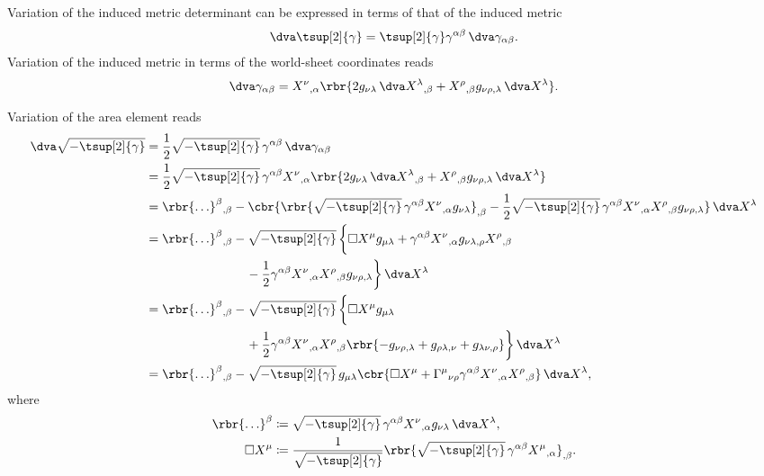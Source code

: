 \documentclass[a4paper,11pt]{article}
\begin{document}
Variation of the induced metric determinant can be expressed in terms of that 
of the induced metric
\begin{align}
\dva \tsup[2]{\gamma} = \tsup[2]{\gamma} \gamma^{\alpha\beta}\,\dva 
	\gamma_{\alpha\beta}.
\end{align}
Variation of the induced metric in terms of the world-sheet coordinates reads 
\begin{align}
\dva \gamma_{\alpha\beta} = X^{\nu}{}_{,\alpha} \rbr{
	2 g_{\nu\lambda}\, \dva X^{\lambda}{}_{,\beta} + 
	X^{\rho}{}_{,\beta} g_{\nu\rho,\lambda}\, \dva X^{\lambda}}.
\end{align}

Variation of the area element reads
\begin{align}
\dva \sqrt{-\tsup[2]{\gamma}} &=
\frac{1}{2} \sqrt{-\tsup[2]{\gamma}}\, \gamma^{\alpha\beta}\,
\dva \gamma_{\alpha\beta}
\nonumber \\
&=
\frac{1}{2} \sqrt{-\tsup[2]{\gamma}}\, \gamma^{\alpha\beta}
X^{\nu}{}_{,\alpha}\rbr{2 g_{\nu\lambda}\, \dva X^{\lambda}{}_{,\beta} + 
	X^{\rho}{}_{,\beta} g_{\nu\rho,\lambda}\, \dva X^{\lambda}}
\nonumber \\
&=
\rbr{\ldots}^{\beta}{}_{,\beta} - \cbr{
\rbr{\sqrt{-\tsup[2]{\gamma}}\, \gamma^{\alpha\beta} 
	X^{\nu}{}_{,\alpha} g_{\nu\lambda}}_{,\beta} - 
\frac{1}{2} \sqrt{-\tsup[2]{\gamma}}\, \gamma^{\alpha\beta} X^{\nu}{}_{,\alpha} 
X^{\rho}{}_{,\beta} g_{\nu\rho,\lambda}}\, \dva X^{\lambda}
\nonumber \\
&=
\rbr{\ldots}^{\beta}{}_{,\beta} - \sqrt{-\tsup[2]{\gamma}}\, \bigg\{
	\square X^{\mu} g_{\mu\lambda} + 
	\gamma^{\alpha\beta} X^{\nu}{}_{,\alpha}
		g_{\nu\lambda,\rho} X^{\rho}{}_{,\beta} 
\nonumber \\
&\qquad\qquad\qquad\qquad -
	\frac{1}{2} \gamma^{\alpha\beta} X^{\nu}{}_{,\alpha} X^{\rho}{}_{,\beta}
		g_{\nu\rho,\lambda} \bigg\}\, \dva X^{\lambda}
\nonumber \\
&=
\rbr{\ldots}^{\beta}{}_{,\beta} - \sqrt{-\tsup[2]{\gamma}}\, \bigg\{
	\square X^{\mu} g_{\mu\lambda} 
\nonumber \\
&\qquad\qquad\qquad\qquad + 
	\frac{1}{2} \gamma^{\alpha\beta} X^{\nu}{}_{,\alpha} X^{\rho}{}_{,\beta}
		\rbr{-g_{\nu\rho,\lambda} + g_{\rho\lambda,\nu} + g_{\lambda\nu,\rho}}
	\bigg\}\, \dva X^{\lambda}
\nonumber \\
&=
\rbr{\ldots}^{\beta}{}_{,\beta} - \sqrt{-\tsup[2]{\gamma}}\, g_{\mu\lambda}
	\cbr{ \square X^{\mu} + 
	\Gamma^{\mu}{}_{\nu\rho} \gamma^{\alpha\beta}
		X^{\nu}{}_{,\alpha} X^{\rho}{}_{,\beta}
	} \, \dva X^{\lambda},
\end{align}
where
\begin{align}
\rbr{\ldots}^{\beta} &\coloneqq \sqrt{-\tsup[2]{\gamma}}\, \gamma^{\alpha\beta}
X^{\nu}{}_{,\alpha} g_{\nu\lambda}\,\dva X^{\lambda},
\\
\square X^{\mu} &\coloneqq
\frac{1}{\sqrt{-\tsup[2]{\gamma}}} \rbr{\sqrt{-\tsup[2]{\gamma}}\, 
	\gamma^{\alpha\beta} X^{\mu}{}_{,\alpha}}_{,\beta}.
\end{align}



\printbibliography
\end{document}
